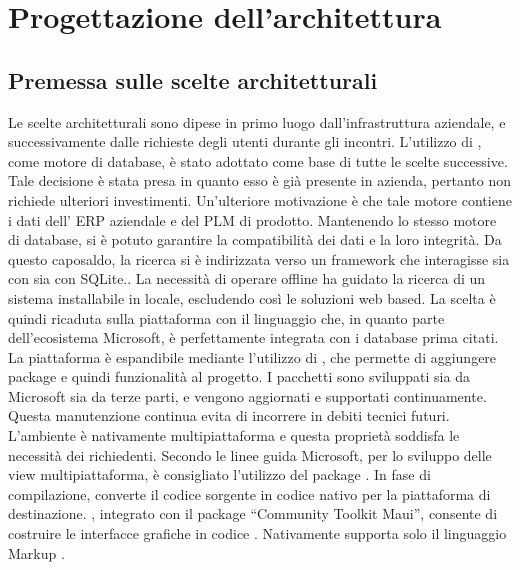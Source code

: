 \chapter{Progettazione dell'architettura}\label{chapter:architettura}
\section{Premessa sulle scelte architetturali}
Le scelte architetturali sono dipese in primo luogo dall'infrastruttura aziendale,
e successivamente dalle richieste degli utenti durante gli incontri.
L'utilizzo di \sqlserver{}, come motore di database, è stato adottato come base di tutte le scelte successive.
Tale decisione è stata presa in quanto esso è già presente in azienda, pertanto non richiede ulteriori investimenti.
Un'ulteriore motivazione è che tale motore contiene i dati dell' \ac{ERP} aziendale e del \ac{PLM} di prodotto.
Mantenendo lo stesso motore di database, si è potuto garantire la compatibilità dei dati e la loro integrità.
Da questo caposaldo, la ricerca si è indirizzata verso un framework che interagisse
sia con \sqlserver{} sia con SQLite.\cite{SQLite}.
La necessità di operare offline ha guidato la ricerca di un sistema installabile in locale,
escludendo così le soluzioni web based.
La scelta è quindi ricaduta sulla piattaforma \dotnet\cite{DotNet} con il linguaggio
\csharp{} che, in quanto parte dell'ecosistema Microsoft,
è perfettamente integrata con i database prima citati.
La piattaforma \dotnet{} è espandibile mediante l'utilizzo di \nuget{}\cite{NuGet},
che permette di aggiungere package e quindi funzionalità al progetto.
I pacchetti sono sviluppati sia da Microsoft sia da terze parti,
e vengono aggiornati e supportati continuamente.
Questa manutenzione continua evita di incorrere in debiti tecnici futuri.
L'ambiente \dotnet{} è nativamente multipiattaforma
e questa proprietà soddisfa le necessità dei richiedenti.
Secondo le linee guida Microsoft, per lo sviluppo delle view multipiattaforma,
è consigliato l'utilizzo del package \nuget{} \dotnet{} \maui{}\cite{MAUI}.
In fase di compilazione, \maui{} converte il codice sorgente in codice nativo per la piattaforma di destinazione.
\maui{}, integrato con il package \nuget{} ``Community Toolkit Maui''\cite{ComTolkit}, consente
di costruire le interfacce grafiche in codice \csharp.
Nativamente \maui{} supporta solo il linguaggio Markup \xaml\cite{XAML}.

